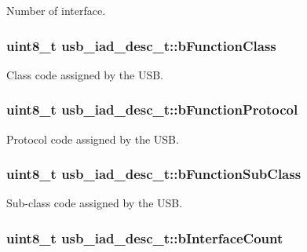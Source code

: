 \-Number of interface. 

\hypertarget{structusb__iad__desc__t_ae013d91f59930b0343201cfe6d5ad82b}{
\subsubsection[{b\-Function\-Class}]{\setlength{\rightskip}{0pt plus 5cm}uint8\-\_\-t {\bf usb\-\_\-iad\-\_\-desc\-\_\-t\-::b\-Function\-Class}}}
\label{structusb__iad__desc__t_ae013d91f59930b0343201cfe6d5ad82b}


\-Class code assigned by the \-U\-S\-B. 

\hypertarget{structusb__iad__desc__t_ac9ddebd0442428896e30837a4b52f771}{
\subsubsection[{b\-Function\-Protocol}]{\setlength{\rightskip}{0pt plus 5cm}uint8\-\_\-t {\bf usb\-\_\-iad\-\_\-desc\-\_\-t\-::b\-Function\-Protocol}}}
\label{structusb__iad__desc__t_ac9ddebd0442428896e30837a4b52f771}


\-Protocol code assigned by the \-U\-S\-B. 

\hypertarget{structusb__iad__desc__t_a32c8d93140dbad4009d6a0027b3ac6f2}{
\subsubsection[{b\-Function\-Sub\-Class}]{\setlength{\rightskip}{0pt plus 5cm}uint8\-\_\-t {\bf usb\-\_\-iad\-\_\-desc\-\_\-t\-::b\-Function\-Sub\-Class}}}
\label{structusb__iad__desc__t_a32c8d93140dbad4009d6a0027b3ac6f2}


\-Sub-\/class code assigned by the \-U\-S\-B. 

\hypertarget{structusb__iad__desc__t_a405850b6548dd1b924e386e3bd8569eb}{
\subsubsection[{b\-Interface\-Count}]{\setlength{\rightskip}{0pt plus 5cm}uint8\-\_\-t {\bf usb\-\_\-iad\-\_\-desc\-\_\-t\-::b\-Interface\-Count}}}
\label{structusb__iad__desc__t_a405850b6548dd1b924e386e3bd8569eb}


